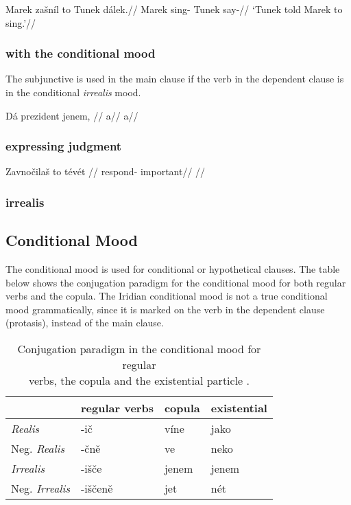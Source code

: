 \pex
\begingl
\gla Marek zašníl to Tunek dálek.//
\glb Marek sing-  Tunek say-//
\glft `Tunek told Marek to sing.'//
\endgl
\xe


\subsubsection{with the conditional mood}
\par The subjunctive is used in the main clause if the verb in the dependent clause is in the conditional \textit{irrealis} mood.

\pex
\begingl
\gla Dá prezident jenem, //
\glb a//
\glft a//
\endgl
\xe

\subsubsection{expressing judgment}

\pex
\begingl
\gla Zavnočilaš to tévét //
\glb respond-  important//
\glft {}//
\endgl
\xe

\subsubsection{irrealis}

\subsection{Conditional Mood}\label{sec:conditional}
\par The conditional mood is used for conditional or hypothetical clauses. The table below shows the conjugation paradigm for the conditional mood for both regular verbs and the copula. The Iridian conditional mood is not a true conditional mood grammatically, since it is marked on the verb in the dependent clause (protasis), instead of the main clause.

\begin{table}[ht!]
	\footnotesize\sffamily
	\caption{Conjugation paradigm in the conditional mood for regular \\verbs, the copula and the existential particle .}\medskip
	\begin{tabu} to 0.8 
		\toprule
		&{\sc regular verbs} & {\sc copula} & {\sc existential}\\
		\midrule

		\textit{Realis} 				&{-ič} &víne & jako\\
		Neg. \textit{Realis}		&{-čn\v{e}}&ve&neko\\

		\textit{Irrealis} 			& {-išče}& jenem & jenem\\
		Neg. \textit{Irrealis} 	& {-iščen\v{e}}& jet & nét\\
		\bottomrule
	\end{tabu}
\end{table}

